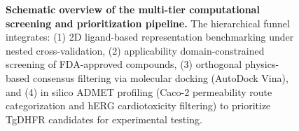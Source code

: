 \begin{figure}[!h]
{%
	}
	\caption{\textbf{Schematic overview of the multi-tier computational screening and prioritization pipeline.} 
		The hierarchical funnel integrates: (1) 2D ligand-based representation benchmarking under nested cross-validation, (2) applicability domain-constrained screening of FDA-approved compounds, (3) orthogonal physics-based consensus filtering via molecular docking (AutoDock Vina), and (4) in silico ADMET profiling (Caco-2 permeability route categorization and hERG cardiotoxicity filtering) to prioritize TgDHFR candidates for experimental testing.}
	\label{fig:pipeline_flowchart}
	\vspace{-10pt}
\end{figure}